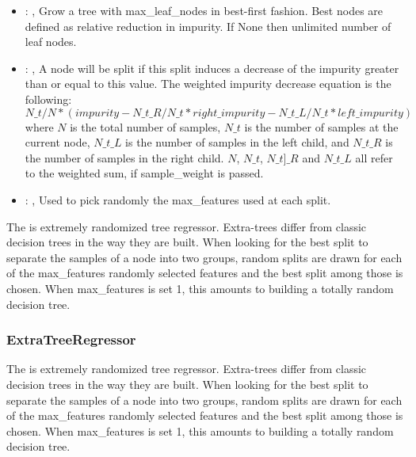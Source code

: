 \begin{itemize}
    \item {}: , 
      Grow a tree with max\_leaf\_nodes in best-first fashion. Best nodes are defined as relative
      reduction                                                  in impurity. If None then unlimited
      number of leaf nodes.

    \item {}: , 
      A node will be split if this split induces a decrease of the impurity greater than or equal to
      this value.                                                  The weighted impurity decrease
      equation is the following:                                                  $N\_t / N *
      (impurity - N\_t\_R / N\_t * right\_impurity - N\_t\_L / N\_t * left\_impurity)$
      where $N$ is the total number of samples, $N\_t$ is the number of samples at the current node,
      $N\_t\_L$ is the number                                                  of samples in the
      left child, and $N\_t\_R$ is the number of samples in the right child.
      $N$, $N\_t$, $N\_t]\_R$ and $N\_t\_L$ all refer to the weighted sum, if sample\_weight is
      passed.

    \item {}: , 
      Used to pick randomly the max\_features used at each split.
  \end{itemize}
 The  is extremely randomized tree regressor.
 Extra-trees differ from classic decision trees in the way they are built. When
 looking for the best split to separate the samples of a node into two groups,
 random splits are drawn for each of the max\_features randomly selected features
 and the best split among those is chosen. When max\_features is set 1, this amounts
 to building a totally random decision tree.

\subsubsection{ExtraTreeRegressor}
  The  is extremely randomized tree regressor.
  Extra-trees differ from classic decision trees in the way they are built. When
  looking for the best split to separate the samples of a node into two groups,
  random splits are drawn for each of the max\_features randomly selected features
  and the best split among those is chosen. When max\_features is set 1, this amounts
  to building a totally random decision tree.

